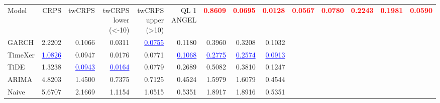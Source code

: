 \begin{tabular}{lrrrrrrrr}
\toprule
Model & CRPS & twCRPS & twCRPS lower (<-10) & twCRPS upper (>10) & QL 1%
\midrule
ANGEL & \textcolor{red}{\textbf{0.8609}} & \textcolor{red}{\textbf{0.0695}} & \textcolor{red}{\textbf{0.0128}} & \textcolor{red}{\textbf{0.0567}} & \textcolor{red}{\textbf{0.0780}} & \textcolor{red}{\textbf{0.2243}} & \textcolor{red}{\textbf{0.1981}} & \textcolor{red}{\textbf{0.0590}} \\
GARCH & 2.2202 & 0.1066 & 0.0311 & \textcolor{blue}{\underline{0.0755}} & 0.1180 & 0.3960 & 0.3208 & 0.1032 \\
TimeXer & \textcolor{blue}{\underline{1.0826}} & 0.0947 & 0.0176 & 0.0771 & \textcolor{blue}{\underline{0.1068}} & \textcolor{blue}{\underline{0.2775}} & \textcolor{blue}{\underline{0.2574}} & \textcolor{blue}{\underline{0.0913}} \\
TiDE & 1.3238 & \textcolor{blue}{\underline{0.0943}} & \textcolor{blue}{\underline{0.0164}} & 0.0779 & 0.2689 & 0.5082 & 0.3810 & 0.1247 \\
ARIMA & 4.8203 & 1.4500 & 0.7375 & 0.7125 & 0.4524 & 1.5979 & 1.6079 & 0.4544 \\
Naive & 5.6707 & 2.1669 & 1.1154 & 1.0515 & 0.5351 & 1.8917 & 1.8916 & 0.5351 \\
\bottomrule
\end{tabular}
